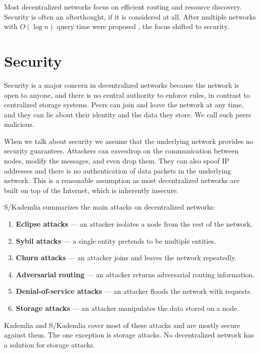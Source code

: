 Most decentralized networks focus on efficient routing and resource discovery.
Security is often an afterthought, if it is considered at all.
After multiple networks with $O(\log n)$ query time were proposed \cite{chord, kademlia, pastry},
the focus shifted to security.

\section{Security}

Security is a major concern in decentralized networks because
the network is open to anyone, and there is no central authority to enforce rules,
in contrast to centralized storage systems.
Peers can join and leave the network at any time, and they can lie about their identity and the data they store.
We call such peers malicious.

When we talk about security we assume that the underlying network provides no security guarantees.
Attackers can eavesdrop on the communication between nodes, modify the messages, and even drop them.
They can also spoof IP addresses and there is no authentication of data packets in the underlying network.
This is a reasonable assumption as most decentralized networks are built on top of the Internet,
which is inherently insecure.

S/Kademlia \cite{skademlia} summarizes the main attacks on decentralized networks:
\begin{enumerate}
    \item \textbf{Eclipse attacks} --- an attacker isolates a node from the rest of the network.
    \item \textbf{Sybil attacks} --- a single entity pretends to be multiple entities.
    \item \textbf{Churn attacks} --- an attacker joins and leaves the network repeatedly.
    \item \textbf{Adversarial routing} --- an attacker returns adversarial routing information.
    \item \textbf{Denial-of-service attacks} --- an attacker floods the network with requests.
    \item \textbf{Storage attacks} --- an attacker manipulates the data stored on a node.
\end{enumerate}

Kademlia and S/Kademlia cover most of these attacks and are mostly secure against them.
The one exception is storage attacks.
No decentralized network has a solution for storage attacks.

